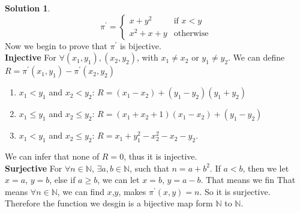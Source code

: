 \documentclass[12pt,a4paper]{article}
\theoremstyle{definition}
\newtheorem*{solution}{Solution}
\numberwithin{equation}{section}
\numberwithin{figure}{section}
\begin{document}
\begin{enumerate}
  \begin{solution}
    \begin{displaymath}
    \pi^{'} = \left\{ \begin{array}{ll}
    x + y^2 & \textrm{if $x < y$}\\
    x^2 + x + y & \textrm{otherwise} 
    \end{array} \right.
    \end{displaymath}
  Now we begin to prove that $\pi^{'}$ is bijective. \\
  \textbf{Injective}
  For $\forall (x_1,y_1),(x_2,y_2)$, with $x_1 \ne x_2$ or $y_1 \ne y_2$. We can define $R  =\pi^{'}(x_1,y_1)-\pi^{'}(x_2,y_2)$
  \begin{enumerate}
  \item $x_1 < y_1$ and $x_2<y_2$: $R=(x_1-x_2) + (y_1 -y_2)(y_1 + y_2)$  
  \item $x_1 \le y_1$ and $x_2 \le y_2$: $R=(x_1+x_2+1)(x_1-x_2)+(y_1-y_2)$
  \item $x_1<y_1$ and $x_2 \le y_2$: $R=x_1 + y_1^2 - x_2^2 -x_2 -y_2$.
  \end{enumerate}
    We can infer that none of $R = 0$, thus it is injective. \\
  \textbf{Surjective} For $\forall n \in \mathbb{N}$, $\exists a,b \in \mathbb{N}$, such that $n = a + b^2$. If $a < b$, then we let $x = a$, $y = b$, else if $ a \ge b$, we can let $x = b$, $y = a -b$. That means we fin  That means $\forall n \in \mathbb{N}$, we can find $x$,$y$, makes $\pi^{'}(x,y) = n$. So it is surjective.\\
  
  Therefore the function we desgin is a bijective map form $\mathbb{N}$ to $\mathbb{N}$.
  \end{solution}
 
\end{enumerate}


\end{document}
